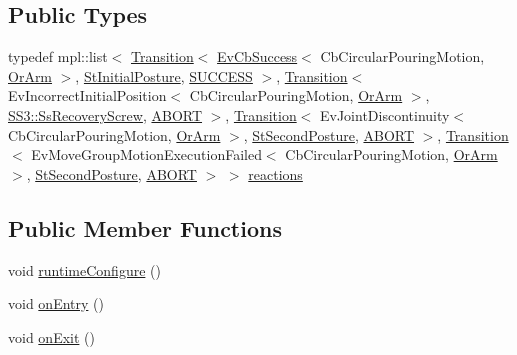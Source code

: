 \subsection*{Public Types}
\begin{DoxyCompactItemize}
\item 
typedef mpl\+::list$<$ \hyperlink{classsmacc_1_1Transition}{Transition}$<$ \hyperlink{structsmacc_1_1EvCbSuccess}{Ev\+Cb\+Success}$<$ Cb\+Circular\+Pouring\+Motion, \hyperlink{classsm__fetch__screw__loop__1_1_1OrArm}{Or\+Arm} $>$, \hyperlink{structsm__fetch__screw__loop__1_1_1StInitialPosture}{St\+Initial\+Posture}, \hyperlink{structsmacc_1_1default__transition__tags_1_1SUCCESS}{S\+U\+C\+C\+E\+SS} $>$, \hyperlink{classsmacc_1_1Transition}{Transition}$<$ Ev\+Incorrect\+Initial\+Position$<$ Cb\+Circular\+Pouring\+Motion, \hyperlink{classsm__fetch__screw__loop__1_1_1OrArm}{Or\+Arm} $>$, \hyperlink{structsm__fetch__screw__loop__1_1_1SS3_1_1SsRecoveryScrew}{S\+S3\+::\+Ss\+Recovery\+Screw}, \hyperlink{structsmacc_1_1default__transition__tags_1_1ABORT}{A\+B\+O\+RT} $>$, \hyperlink{classsmacc_1_1Transition}{Transition}$<$ Ev\+Joint\+Discontinuity$<$ Cb\+Circular\+Pouring\+Motion, \hyperlink{classsm__fetch__screw__loop__1_1_1OrArm}{Or\+Arm} $>$, \hyperlink{structsm__fetch__screw__loop__1_1_1StSecondPosture}{St\+Second\+Posture}, \hyperlink{structsmacc_1_1default__transition__tags_1_1ABORT}{A\+B\+O\+RT} $>$, \hyperlink{classsmacc_1_1Transition}{Transition}$<$ Ev\+Move\+Group\+Motion\+Execution\+Failed$<$ Cb\+Circular\+Pouring\+Motion, \hyperlink{classsm__fetch__screw__loop__1_1_1OrArm}{Or\+Arm} $>$, \hyperlink{structsm__fetch__screw__loop__1_1_1StSecondPosture}{St\+Second\+Posture}, \hyperlink{structsmacc_1_1default__transition__tags_1_1ABORT}{A\+B\+O\+RT} $>$ $>$ \hyperlink{structsm__fetch__screw__loop__1_1_1StSecondPosture_a9fe38ed5563e5f49b11f4a16f4ca2042}{reactions}
\end{DoxyCompactItemize}
\subsection*{Public Member Functions}
\begin{DoxyCompactItemize}
\item 
void \hyperlink{structsm__fetch__screw__loop__1_1_1StSecondPosture_a8b2ca07209252d93c272cce7f7121ce9}{runtime\+Configure} ()
\item 
void \hyperlink{structsm__fetch__screw__loop__1_1_1StSecondPosture_aab9d3da0e164bee4b305ba7bfc047ad0}{on\+Entry} ()
\item 
void \hyperlink{structsm__fetch__screw__loop__1_1_1StSecondPosture_a0a5a28353b93976d17488ff34bfac047}{on\+Exit} ()
\end{DoxyCompactItemize}
